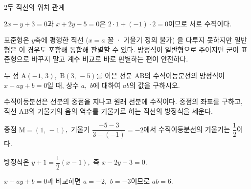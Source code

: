 \documentclass[10pt]{article}
\begin{document}
\begin{dmconcept}{2}{두 직선의 위치 관계}
\begin{dmexample}
$2x - y + 3 = 0$과 $x + 2y - 5 = 0$은 $2 \cdot 1 + (-1) \cdot 2 = 0$이므로 서로 수직이다.
\end{dmexample}

\begin{dmnote}
표준형은 $y$축에 평행한 직선 ($x = a$ 꼴 · 기울기 정의 불가) 을 다루지 못하지만 일반형은 이 경우도 포함해 통합해 판별할 수 있다. 방정식이 일반형으로 주어지면 굳이 표준형으로 바꾸지 말고 계수 비교로 바로 판별하는 편이 안전하다.
\end{dmnote}

\end{dmconcept}

\newpage


\begin{dmproblem}
두 점 $\mathrm{A}(-1,\, 3)$,\ $\mathrm{B}(3,\, -5)$를 이은 선분 $\overline{\mathrm{AB}}$의 수직이등분선의 방정식이 $x + ay + b = 0$일 때, 상수 $a$,\ $b$에 대하여 $ab$의 값을 구하시오.
\end{dmproblem}

\begin{dmapproach}
수직이등분선은 선분의 중점을 지나고 원래 선분에 수직이다. 중점의 좌표를 구하고, 직선 $\mathrm{AB}$의 기울기의 음의 역수를 기울기로 하는 직선의 방정식을 세운다.
\end{dmapproach}

\begin{dmsolution}
중점 $\mathrm{M} = (1,\, -1)$,\ 기울기 $\dfrac{-5-3}{3-(-1)} = -2$에서 수직이등분선의 기울기는 $\dfrac{1}{2}$이다.

방정식은 $y + 1 = \dfrac{1}{2}(x - 1)$,\ 즉 $x - 2y - 3 = 0$.

$x + ay + b = 0$과 비교하면 $a = -2$,\ $b = -3$이므로 $ab = 6$.
\end{dmsolution}

\dmchecktitle



\newpage
\end{document}
